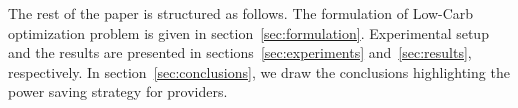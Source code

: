 The rest of the paper is structured as follows. The formulation
of Low-Carb optimization problem is given in
section~\ref{sec:formulation}. Experimental setup and the
results are presented in sections~\ref{sec:experiments}
and~\ref{sec:results}, respectively. In
section~\ref{sec:conclusions}, we draw the conclusions
highlighting the power saving strategy for providers.
